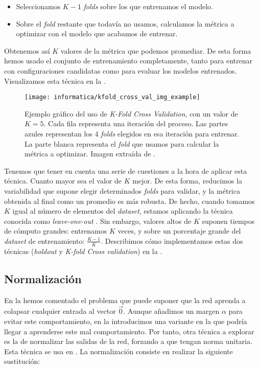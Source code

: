 \begin{itemize}
    \item Seleccionamos $K-1$ \textit{folds} sobre los que entrenamos el modelo.
    \item Sobre el \textit{fold} restante que todavía no usamos, calculamos la métrica a optimizar con el modelo que acabamos de entrenar.
\end{itemize}

Obtenemos así $K$ valores de la métrica que podemos promediar. De esta forma hemos usado el conjunto de entrenamiento completamente, tanto para entrenar con configuraciones candidatas como para evaluar los modelos entrenados. Visualizamos esta técnica en la .

\begin{figure}[!hbtp]
    \centering
    \texttt{[image: informatica/kfold\_cross\_val\_img\_example]}
    \caption{Ejemplo gráfico del uso de \textit{K-Fold Cross Validation}, con un valor de $K = 5$. Cada fila representa una iteración del proceso. Las partes azules representan los 4 \textit{folds} elegidos en esa iteración para entrenar. La parte blanca representa el \textit{fold} que usamos para calcular la métrica a optimizar. Imagen extraída de \cite{informatica:kfold_cross_val_img_web}.}
    \label{img:visualizacion_kfold_cv}
\end{figure}

Tenemos que tener en cuenta una serie de cuestiones a la hora de aplicar esta técnica. Cuanto mayor sea el valor de $K$ mejor. De esta forma, reducimos la variabilidad que supone elegir determinados \textit{folds} para validar, y la métrica obtenida al final como un promedio es más robusta. De hecho, cuando tomamos $K$ igual al número de elementos del \textit{dataset}, estamos aplicando la técnica conocida como \textit{leave-one-out} \cite{informatica:kfold_cross_val_paper}. Sin embargo, valores altos de $K$ suponen tiempos de cómputo grandes: entrenamos $K$ veces, y sobre un porcentaje grande del \textit{dataset} de entrenamiento: $\frac{K - 1}{K}$. Describimos cómo implementamos estas dos técnicas (\textit{holdout} y \textit{K-fold Cross validation}) en la .

\subsection{Normalización} \label{isubs:normalizacion_teoria}

En la  hemos comentado el problema que puede suponer que la red aprenda a colapsar cualquier entrada al vector $\vec{0}$. Aunque añadimos un margen $\alpha$ para evitar este comportamiento, en la  introducimos una variante en la que podría llegar a aprenderse este mal comportamiento. Por tanto, otra técnica a explorar es la de normalizar las salidas de la red, forzando a que tengan norma unitaria. Esta técnica se usa en \cite{informatica:facenet}. La normalización consiste en realizar la siguiente sustitución:

